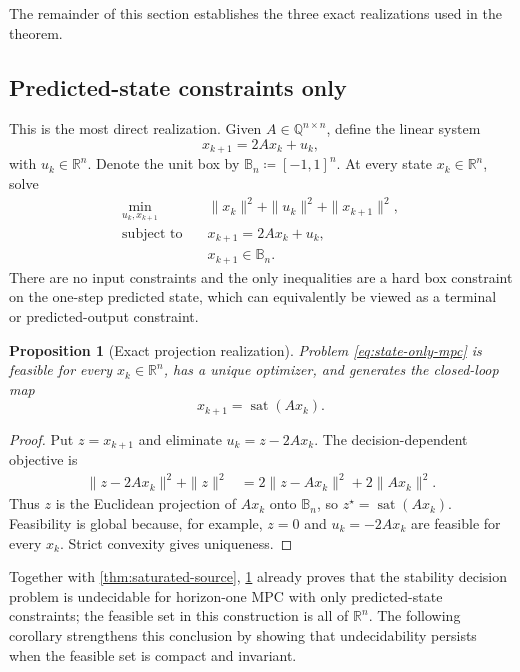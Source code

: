 \documentclass{IEEEtran}
\newtheorem{proposition}[theorem]{Proposition}
\theoremstyle{remark}
\newcommand{\R}{\mathbb{R}}
\newcommand{\Q}{\mathbb{Q}}
\newcommand{\B}{\mathbb{B}}
\newcommand{\sat}{\operatorname{sat}}
\begin{document}
The remainder of this section establishes the three exact realizations used in the theorem.

\subsection{Predicted-state constraints only}
\label{sec:hard-state}

This is the most direct realization.  Given $A\in\Q^{n\times n}$, define the linear system
\begin{equation}
  x_{k+1}=2Ax_k+u_k,
  \label{eq:state-only-plant}
\end{equation}
with $u_k\in\R^n$.  Denote the unit box by $\B_n\coloneqq[-1,1]^n$.  At every state $x_k\in\R^n$, solve
\begin{subequations}
\label{eq:state-only-mpc}
\begin{align}
  \min_{u_k,x_{k+1}}\quad & \|x_k\|^2+\|u_k\|^2+\|x_{k+1}\|^2,\\
  \text{subject to}\quad & x_{k+1}=2Ax_k+u_k,\\
  & x_{k+1}\in\B_n.
\end{align}
\end{subequations}
There are no input constraints and the only
inequalities are a hard box constraint on the one-step predicted state, which can
equivalently be viewed as a terminal or predicted-output constraint.

\begin{proposition}[Exact projection realization]
\label{prop:state-only}
Problem \eqref{eq:state-only-mpc} is feasible for every $x_k\in\R^n$, has a unique
optimizer, and generates the closed-loop map
\[
  x_{k+1}=\sat(Ax_k).
\]
\end{proposition}

\begin{proof}
Put $z=x_{k+1}$ and eliminate $u_k=z-2Ax_k$.  The decision-dependent objective is
\begin{align*}
  \|z-2Ax_k\|^2+\|z\|^2
  &=2\|z-Ax_k\|^2+2\|Ax_k\|^2.
\end{align*}
Thus $z$ is the Euclidean projection of $Ax_k$ onto $\B_n$, so
$z^\star=\sat(Ax_k)$.  Feasibility is global because, for example, $z=0$ and
$u_k=-2Ax_k$ are feasible for every $x_k$.  Strict convexity gives uniqueness.
\end{proof}

Together with \cref{thm:saturated-source}, \cref{prop:state-only} already proves that
the stability decision problem is undecidable for horizon-one MPC with only
predicted-state constraints; the feasible set in this construction is all of
$\R^n$. The following corollary strengthens this conclusion by showing that
undecidability persists when the feasible set is compact and invariant.
\end{document}
